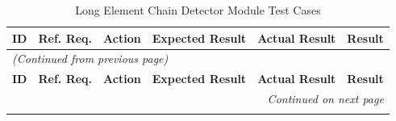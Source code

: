 \documentclass[12pt, titlepage]{article}
\begin{document}
\begin{longtable}{c 
  >{\raggedright\arraybackslash}p{1.5cm} 
  >{\raggedright\arraybackslash}p{4.5cm} 
  >{\raggedright\arraybackslash}p{4cm} 
  >{\raggedright\arraybackslash}p{3cm} c}
  \toprule
  \textbf{ID} & \textbf{Ref. Req.} & \textbf{Action} & \textbf{Expected Result} & \textbf{Actual Result} & \textbf{Result} \\ 
  \midrule
  \endfirsthead

  \multicolumn{6}{l}{\textit{(Continued from previous page)}} \\ 
  \toprule
  \textbf{ID} & \textbf{Ref. Req.} & \textbf{Action} & \textbf{Expected Result} & \textbf{Actual Result} & \textbf{Result} \\ 
  \midrule
  \endhead

  \multicolumn{6}{r}{\textit{Continued on next page}} \\
  \endfoot

  \bottomrule
  \caption{Long Element Chain Detector Module Test Cases}
  \label{table:lec_tests}
  \endlastfoot


\end{longtable}
\end{document}
